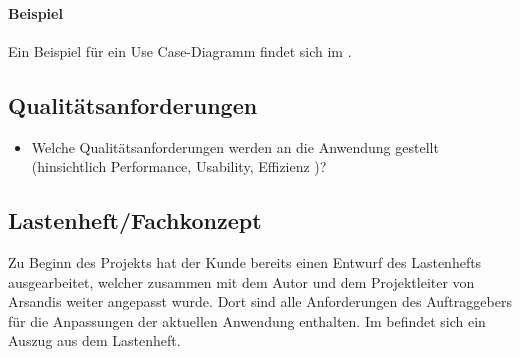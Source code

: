 \paragraph{Beispiel}
Ein Beispiel für ein Use Case-Diagramm findet sich im .


\subsection{Qualitätsanforderungen}
\label{sec:Qualitaetsanforderungen}
\begin{itemize}
	\item Welche Qualitätsanforderungen werden an die Anwendung gestellt (\zB hinsichtlich Performance, Usability, Effizienz \etc )?
\end{itemize}


\subsection{Lastenheft/Fachkonzept}
\label{sec:Lastenheft}
Zu Beginn des Projekts hat der Kunde bereits einen Entwurf des Lastenhefts ausgearbeitet, welcher zusammen mit dem Autor und dem Projektleiter von Arsandis weiter angepasst wurde.
Dort sind alle Anforderungen des Auftraggebers für die Anpassungen der aktuellen Anwendung enthalten.
Im  befindet sich ein Auszug aus dem Lastenheft.

